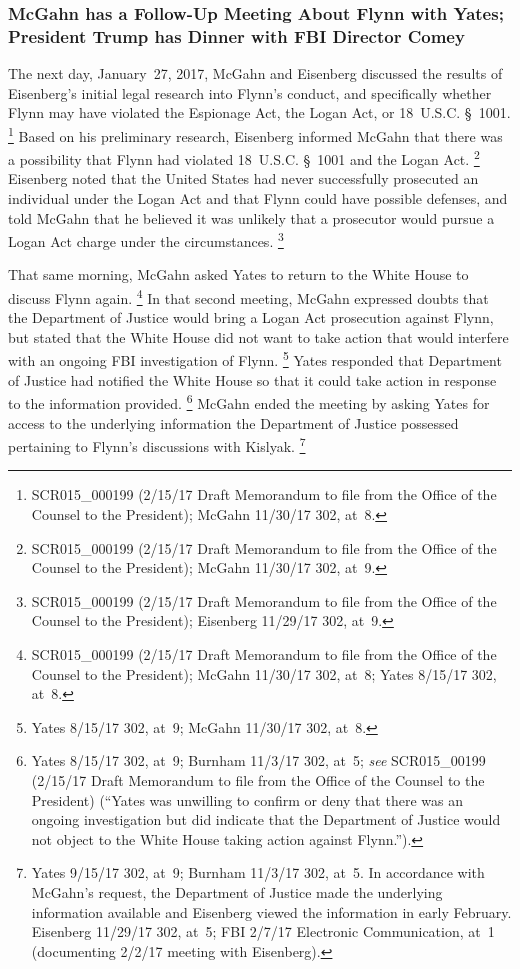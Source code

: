 \subsubsection{McGahn has a Follow-Up Meeting About Flynn with Yates; President Trump has Dinner with FBI Director Comey}

The next day, January~27, 2017, McGahn and Eisenberg discussed the results of Eisenberg's initial legal research into Flynn's conduct, and specifically whether Flynn may have violated the Espionage Act, the Logan Act, or 18~U.S.C. \S~1001.%
\footnote{SCR015\_000199 (2/15/17 Draft Memorandum to file from the Office of the Counsel to the President);
McGahn 11/30/17 302, at~8.}
Based on his preliminary research, Eisenberg informed McGahn that there was a possibility that Flynn had violated 18~U.S.C. \S~1001 and the Logan Act.%
\footnote{SCR015\_000199 (2/15/17 Draft Memorandum to file from the Office of the Counsel to the President);
McGahn 11/30/17 302, at~9.}
Eisenberg noted that the United States had never successfully prosecuted an individual under the Logan Act and that Flynn could have possible defenses, and told McGahn that he believed it was unlikely that a prosecutor would pursue a Logan Act charge under the circumstances.%
\footnote{SCR015\_000199 (2/15/17 Draft Memorandum to file from the Office of the Counsel to the President);
Eisenberg 11/29/17 302, at~9.}

That same morning, McGahn asked Yates to return to the White House to discuss Flynn again.%
\footnote{SCR015\_000199 (2/15/17 Draft Memorandum to file from the Office of the Counsel to the President);
McGahn 11/30/17 302, at~8;
Yates 8/15/17 302, at~8.}
In that second meeting, McGahn expressed doubts that the Department of Justice would bring a Logan Act prosecution against Flynn, but stated that the White House did not want to take action that would interfere with an ongoing FBI investigation of Flynn.%
\footnote{Yates 8/15/17 302, at~9;
McGahn 11/30/17 302, at~8.}
Yates responded that Department of Justice had notified the White House so that it could take action in response to the information provided.%
\footnote{Yates 8/15/17 302, at~9;
Burnham 11/3/17 302, at~5;
\textit{see} SCR015\_00199 (2/15/17 Draft Memorandum to file from the Office of the Counsel to the President) (``Yates was unwilling to confirm or deny that there was an ongoing investigation but did indicate that the Department of Justice would not object to the White House taking action against Flynn.'').}
McGahn ended the meeting by asking Yates for access to the underlying information the Department of Justice possessed pertaining to Flynn's discussions with Kislyak.%
\footnote{Yates 9/15/17 302, at~9;
Burnham 11/3/17 302, at~5.
In accordance with McGahn's request, the Department of Justice made the underlying information available and Eisenberg viewed the information in early February.
Eisenberg 11/29/17 302, at~5;
FBI 2/7/17 Electronic Communication, at~1 (documenting 2/2/17 meeting with Eisenberg).}

